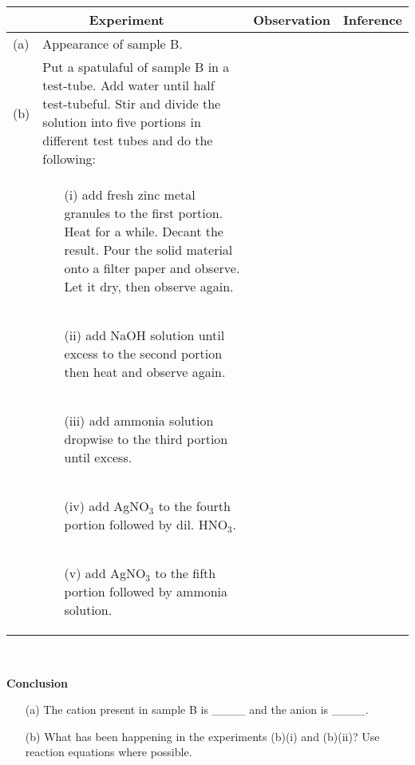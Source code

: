\begin{enumerate}
\begin{center}
\begin{tabular}{|l|p{8cm}|l|l|}
\hline
\multicolumn{2}{|c|}{\textbf{Experiment}}&\textbf{Observation}&\textbf{Inference}\\ \hline
(a)&Appearance of sample B.&&\\ \hline
(b)&Put a spatulaful of sample B in a test-tube. Add water until half test-tubeful. Stir and divide the solution into five portions in different test tubes and do the following:&&\\ \cline{2-4}
&\begin{enumerate}
\item[(i)] add fresh zinc metal granules to the first portion. Heat for a while. Decant the result. Pour the solid material onto a filter paper and observe. Let it dry, then observe again.
\end{enumerate}&&\\ \cline{2-4}
&\begin{enumerate}
\item[(ii)] add NaOH solution until excess to the second portion then heat and observe again.
\end{enumerate}&&\\ \cline{2-4}
&\begin{enumerate}
\item[(iii)] add ammonia solution dropwise to the third portion until excess.
\end{enumerate}&&\\ \cline{2-4}
&\begin{enumerate}
\item[(iv)] add AgNO$_3$ to the fourth portion followed by dil. HNO$_3$.
\end{enumerate}&&\\ \cline{2-4}
&\begin{enumerate}
\item[(v)] add AgNO$_3$ to the fifth portion followed by ammonia solution.
\end{enumerate}&&\\ \hline
\end{tabular}\\

\end{center}


\textbf{Conclusion}\\

\begin{enumerate}
\item[(a)] The cation present in sample B is \_\_\_\_ and the anion is \_\_\_\_.
\item[(b)] What has been happening in the experiments (b)(i) and (b)(ii)? Use reaction equations where possible.
\end{enumerate}


\end{enumerate}

